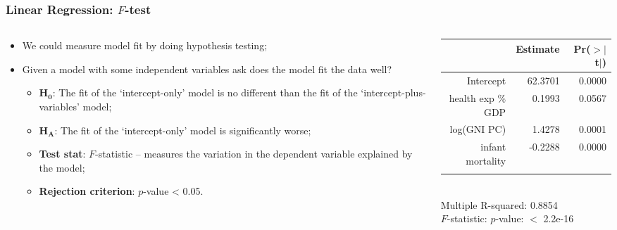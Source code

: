 \documentclass[aspectratio=169]{beamer}
\theoremstyle{principle}
\begin{document}
\begin{frame}
\frametitle{Linear Regression: $F$-test}

\begin{columns}
\begin{column}{0.5\textwidth}

\begin{itemize}
\item We could measure model fit by doing hypothesis testing;
\bigskip
\bigskip

\item Given a model with some independent variables ask does the model fit the data well?
\begin{itemize}
\item $\mathbf{H_0}$: The fit of the `intercept-only' model is no different than the fit of the `intercept-plus-variables' model;
\item $\mathbf{H_A}$: The fit of the `intercept-only' model is significantly worse;
\item \textbf{Test stat}: \color{white}$F$-statistic -- measures the variation in the dependent variable explained by the model;\color{black}
\item \textbf{Rejection criterion}: \color{white}$p$-value < 0.05.
\end{itemize}


\end{itemize}

\end{column}
\begin{column}{0.5\textwidth}

\begin{table}[ht]
\centering
\begin{tabular}{rrr}
  \hline
   \hline
 & Estimate & Pr($>$$|$t$|$) \\ 
  \hline
   \hline
Intercept & 62.3701 & 0.0000 \\ 
  health exp \% GDP & 0.1993 & 0.0567 \\ 
  log(GNI PC) & 1.4278 & 0.0001 \\ 
  infant mortality & -0.2288 & 0.0000 \\ 
   \hline
   \hline
   &&\\
\end{tabular}\\
Multiple R-squared:  0.8854\\ 
\color{white}$F$-statistic: $p$-value: $<$ 2.2e-16
\end{table}

\end{column}
\end{columns}

\end{frame}
\end{document}
